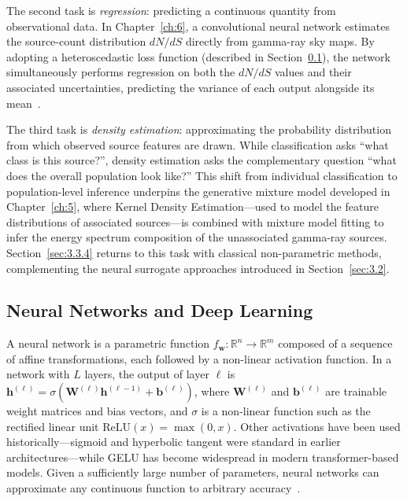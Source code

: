 The second task is \textit{regression}: predicting a continuous quantity from observational data.
In Chapter~\ref{ch:6}, a convolutional neural network estimates the source-count distribution $dN/dS$ directly from gamma-ray sky maps.
By adopting a heteroscedastic loss function (described in Section~\ref{sec:3.3.2}), the network simultaneously performs regression on both the $dN/dS$ values and their associated uncertainties, predicting the variance of each output alongside its mean~\cite{heteroscedastic-error}.

The third task is \textit{density estimation}: approximating the probability distribution from which observed source features are drawn.
While classification asks ``what class is this source?'', density estimation asks the complementary question ``what does the overall population look like?''
This shift from individual classification to population-level inference underpins the generative mixture model developed in Chapter~\ref{ch:5}, where Kernel Density Estimation---used to model the feature distributions of associated sources---is combined with mixture model fitting to infer the energy spectrum composition of the unassociated gamma-ray sources.
Section~\ref{sec:3.3.4} returns to this task with classical non-parametric methods, complementing the neural surrogate approaches introduced in Section~\ref{sec:3.2}.

\subsection{Neural Networks and Deep Learning}
\label{sec:3.3.2}

A neural network is a parametric function $f_{\boldsymbol{w}}: \mathbb{R}^n \to \mathbb{R}^m$ composed of a sequence of affine transformations, each followed by a non-linear activation function.
In a network with $L$ layers, the output of layer $\ell$ is $\mathbf{h}^{(\ell)} = \sigma(\mathbf{W}^{(\ell)}\mathbf{h}^{(\ell-1)} + \mathbf{b}^{(\ell)})$, where $\mathbf{W}^{(\ell)}$ and $\mathbf{b}^{(\ell)}$ are trainable weight matrices and bias vectors, and $\sigma$ is a non-linear function such as the rectified linear unit $\mathrm{ReLU}(x) = \max(0, x)$.
Other activations have been used historically---sigmoid and hyperbolic tangent were standard in earlier architectures---while GELU has become widespread in modern transformer-based models.
Given a sufficiently large number of parameters, neural networks can approximate any continuous function to arbitrary accuracy~\cite{bishop,Goodfellow:2016dlbook}.

